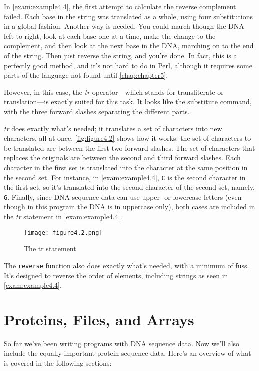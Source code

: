 In \autoref{exam:example4.4}, the first attempt to calculate the reverse complement failed. Each base in the string was translated as a whole, using four substitutions in a global fashion. Another way is needed. You could march though the DNA left to right, look at each base one at a time, make the change to the complement, and then look at the next base in the DNA, marching on to the end of the string. Then just reverse the string, and you're done. In fact, this is a perfectly good method, and it's not hard to do in Perl, although it requires some parts of the language not found until \autoref{chap:chapter5}.

However, in this case, the \textit{tr} operator—which stands for transliterate or translation—is exactly suited for this task. It looks like the substitute command, with the three forward slashes separating the different parts.

\textit{tr} does exactly what's needed; it translates a set of characters into new characters, all at once. \autoref{fig:figure4.2} shows how it works: the set of characters to be translated are between the first two forward slashes. The set of characters that replaces the originals are between the second and third forward slashes. Each character in the first set is translated into the character at the same position in the second set. For instance, in \autoref{exam:example4.4}, \verb|C| is the second character in the first set, so it's translated into the second character of the second set, namely, \verb|G|. Finally, since DNA sequence data can use upper- or lowercase letters (even though in this program the DNA is in uppercase only), both cases are included in the \textit{tr} statement in \autoref{exam:example4.4}.

\begin{figure}
  \centering
  \texttt{[image: figure4.2.png]}
  \caption{The tr statement}
  \label{fig:figure4.2}
\end{figure}

The \verb|reverse| function also does exactly what's needed, with a minimum of fuss. It's designed to reverse the order of elements, including strings as seen in \autoref{exam:example4.4}.

\section{Proteins, Files, and Arrays}
So far we've been writing programs with DNA sequence data. Now we'll also include the equally important protein sequence data. Here's an overview of what is covered in the following sections:

